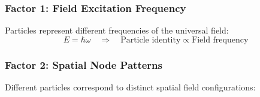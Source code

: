 	\subsubsection{Factor 1: Field Excitation Frequency}
	\label{subsubsec:excitation_frequency}
	
	Particles represent different frequencies of the universal field:
	\begin{equation}
		E = \hbar \omega \quad \Rightarrow \quad \text{Particle identity} \propto \text{Field frequency}
		\label{eq:frequency_identity}
	\end{equation}
	
	\begin{table}[htbp]
		\centering
		\caption{Particle classification by field frequency}
		\label{tab:frequency_classification}
	\end{table}
	
	\subsubsection{Factor 2: Spatial Node Patterns}
	\label{subsubsec:spatial_patterns}
	
	Different particles correspond to distinct spatial field configurations:
	
	\begin{table}[htbp]
		\centering
		\caption{Spatial field patterns for particle types}
		\label{tab:spatial_field_patterns}
	\end{table}
	

